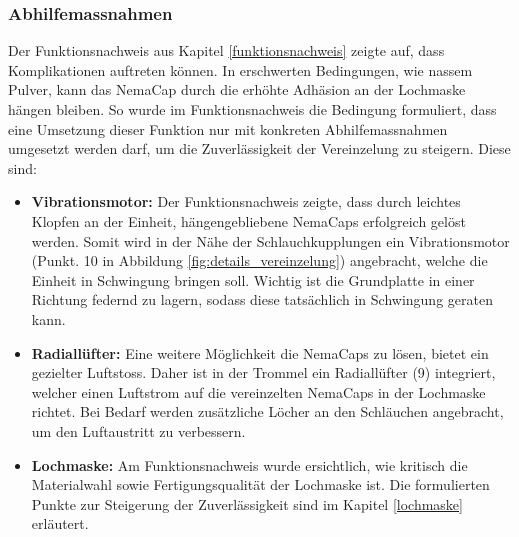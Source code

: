 \subsubsection{Abhilfemassnahmen}
Der Funktionsnachweis aus Kapitel \ref{funktionsnachweis} zeigte auf, dass Komplikationen auftreten können. In erschwerten Bedingungen, wie nassem Pulver, kann das NemaCap  durch die erhöhte Adhäsion an der Lochmaske hängen bleiben. So wurde im Funktionsnachweis die Bedingung formuliert, dass eine Umsetzung dieser Funktion nur mit konkreten Abhilfemassnahmen umgesetzt werden darf, um die Zuverlässigkeit der Vereinzelung zu steigern. Diese sind:
\begin{itemize}
	\item \textbf{Vibrationsmotor:} Der Funktionsnachweis zeigte, dass durch leichtes Klopfen an der Einheit, hängengebliebene NemaCaps erfolgreich gelöst werden. Somit wird in der Nähe der Schlauchkupplungen ein Vibrationsmotor (Punkt. 10 in Abbildung \ref{fig:details_vereinzelung}) angebracht, welche die Einheit in Schwingung bringen soll. Wichtig ist die Grundplatte in einer Richtung federnd zu lagern, sodass diese tatsächlich in Schwingung geraten kann.

	
	\item \textbf{Radiallüfter:} Eine weitere Möglichkeit die NemaCaps zu lösen, bietet ein gezielter Luftstoss. Daher ist in der Trommel ein Radiallüfter (9) integriert, welcher einen Luftstrom auf die vereinzelten NemaCaps in der Lochmaske richtet. Bei Bedarf werden zusätzliche Löcher an den Schläuchen angebracht, um den Luftaustritt zu verbessern. 
	
	\item \textbf{Lochmaske:} Am Funktionsnachweis wurde ersichtlich, wie kritisch die Materialwahl sowie Fertigungsqualität der Lochmaske ist. Die formulierten Punkte zur Steigerung der Zuverlässigkeit sind im Kapitel \ref{lochmaske} erläutert.
\end{itemize}

